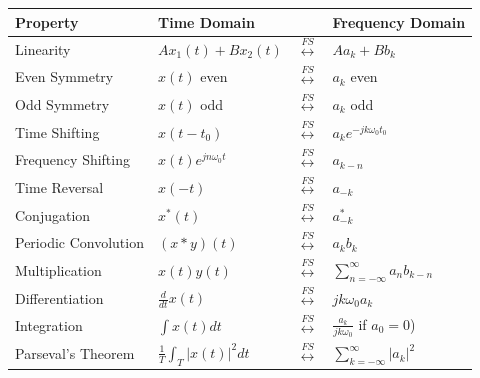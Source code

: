\begin{table}[ht]
    \centering
    \label{tab:ctfourier_properties}
    \begin{tabular}{llll}
        \toprule
        \textbf{Property}    & \textbf{Time Domain}             &                                 & \textbf{Frequency Domain}                 \\
        \midrule
        Linearity            & $A x_1(t) + B x_2(t)$            & $\overset{FS}{\leftrightarrow}$ & $A a_k + B b_k$                           \\
        Even Symmetry        & $x(t)$ even                      & $\overset{FS}{\leftrightarrow}$ & $a_k$ even                                \\
        Odd Symmetry         & $x(t)$ odd                       & $\overset{FS}{\leftrightarrow}$ & $a_k$ odd                                 \\
        Time Shifting        & $x(t - t_0)$                     & $\overset{FS}{\leftrightarrow}$ & $a_k e^{-j k \omega_0 t_0}$               \\
        Frequency Shifting   & $x(t) e^{j n \omega_0 t}$        & $\overset{FS}{\leftrightarrow}$ & $a_{k - n}$                               \\
        Time Reversal        & $x(-t)$                          & $\overset{FS}{\leftrightarrow}$ & $a_{-k}$                                  \\
        Conjugation          & $x^*(t)$                         & $\overset{FS}{\leftrightarrow}$ & $a_{-k}^*$                                \\
        Periodic Convolution & $(x \ast y)(t)$                  & $\overset{FS}{\leftrightarrow}$ & $a_k b_k$                                 \\
        Multiplication       & $x(t) y(t)$                      & $\overset{FS}{\leftrightarrow}$ & $\sum_{n=-\infty}^{\infty} a_n b_{k - n}$ \\
        Differentiation      & $\frac{d}{dt} x(t)$              & $\overset{FS}{\leftrightarrow}$ & $j k \omega_0 a_k$                        \\
        Integration          & $\int x(t) dt$                   & $\overset{FS}{\leftrightarrow}$ & $\frac{a_k}{j k \omega_0}$ if $a_0 = 0$)  \\
        Parseval's Theorem   & $\frac{1}{T} \int_T |x(t)|^2 dt$ & $\overset{FS}{\leftrightarrow}$ & $\sum_{k=-\infty}^{\infty} |a_k|^2$       \\
        \bottomrule
    \end{tabular}
\end{table}

